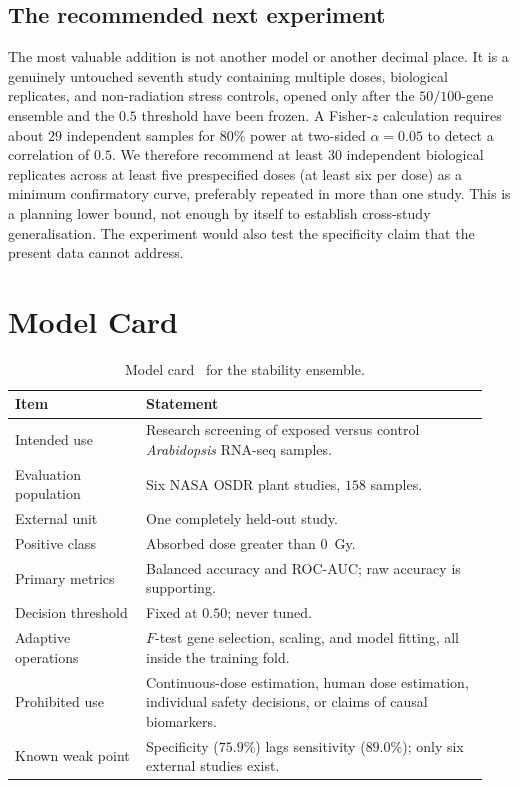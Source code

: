 \documentclass[manuscript,nonacm]{acmart}
\begin{document}
\subsection{The recommended next experiment}
The most valuable addition is not another model or another decimal place. It is a
genuinely untouched seventh study containing multiple doses, biological replicates, and
non-radiation stress controls, opened only after the $50/100$-gene ensemble and the
$0.5$ threshold have been frozen. A Fisher-$z$ calculation requires about $29$
independent samples for $80\%$ power at two-sided $\alpha=0.05$ to detect a correlation
of $0.5$. We therefore recommend at least $30$ independent biological replicates across
at least five prespecified doses (at least six per dose) as a minimum confirmatory curve,
preferably repeated in more than one study. This is a planning lower bound, not enough
by itself to establish cross-study generalisation. The experiment would also test the
specificity claim that the present data cannot address.

\section{Model Card}
\begin{table}[H]
\centering
\caption{Model card~\cite{mitchell2019modelcards} for the stability ensemble.}
\label{tab:card}
\begin{tabular}{@{}p{0.26\linewidth}p{0.68\linewidth}@{}}
\toprule
Item & Statement\\
\midrule
Intended use & Research screening of exposed versus control \emph{Arabidopsis} RNA-seq samples.\\
Evaluation population & Six NASA OSDR plant studies, $158$ samples.\\
External unit & One completely held-out study.\\
Positive class & Absorbed dose greater than $0$~Gy.\\
Primary metrics & Balanced accuracy and ROC-AUC; raw accuracy is supporting.\\
Decision threshold & Fixed at $0.50$; never tuned.\\
Adaptive operations & $F$-test gene selection, scaling, and model fitting, all inside the training fold.\\
Prohibited use & Continuous-dose estimation, human dose estimation, individual safety decisions, or claims of causal biomarkers.\\
Known weak point & Specificity ($75.9\%$) lags sensitivity ($89.0\%$); only six external studies exist.\\
\bottomrule
\end{tabular}
\end{table}
\end{document}
